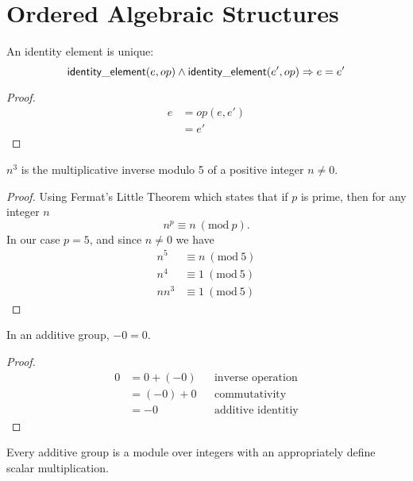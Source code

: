 \chapter{Ordered Algebraic Structures}

\begin{lemma}
	An identity element is unique:
	\[ \mathsf{identity\_element}(e, op) \wedge \mathsf{identity\_element}(e', op) \Rightarrow e = e' \]
\end{lemma}

\begin{proof}
	\begin{align*}
		e &= op(e, e')\\
		  &= e'
	\end{align*}
\end{proof}

\begin{lemma}
	$n^3$ is the multiplicative inverse modulo 5 of a positive integer $n \neq 0$.
\end{lemma}

\begin{proof}
	Using Fermat's Little Theorem which states that if $p$ is prime, then for any integer $n$
	\[ n^p \equiv n\ (\textrm{mod}\ p). \]
	In our case $p = 5$, and since $n \neq 0$ we have
	\begin{align*}
		n^5 &\equiv n\ (\textrm{mod}\ 5)\\
		n^4 &\equiv 1\ (\textrm{mod}\ 5)\\
		nn^3 &\equiv 1\ (\textrm{mod}\ 5)
	\end{align*}
\end{proof}

\begin{lemma}
	In an additive group, $-0 = 0$.
\end{lemma}

\begin{proof}
	\begin{align*}
		0 &= 0 + (-0) && \text{inverse operation}\\
		  &= (-0) + 0 && \text{commutativity}\\
		  &= -0       && \text{additive identitiy}
	\end{align*}
\end{proof}

\begin{lemma}
	Every additive group is a module over integers with an appropriately
	define scalar multiplication.
\end{lemma}
